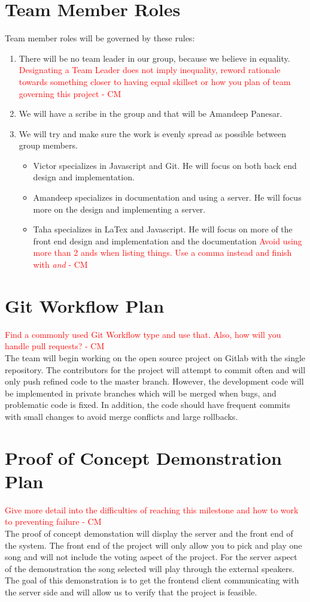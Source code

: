 \documentclass{article}
\begin{document}
\section{Team Member Roles}
Team member roles will be governed by these rules:
\begin{enumerate}
\item There will be no team leader in our group, because we believe in equality. \textcolor{red}{ Designating a Team Leader does not imply inequality, reword rationale towards something closer to having equal skillset or how you plan of team governing this project - CM} 
\item We will have a scribe in the group and that will be Amandeep Panesar.
\item We will try and make sure the work is evenly spread as possible between group members.
\begin{itemize}
\item Victor specializes in Javascript and Git. He will focus on both back end design and implementation.
\item Amandeep specializes in documentation and using a server. He will focus more on the design and implementing a server.
\item Taha specializes in LaTex and Javascript. He will focus on more of the front end design and implementation and the documentation \textcolor{red}{Avoid using more than 2 ands when listing things. Use a comma instead and finish with \textit{and} - CM} 
\end{itemize}
\end{enumerate}
\section{Git Workflow Plan}
\textcolor{red}{Find a commonly used Git Workflow type and use that. Also, how will you handle pull requests?  - CM} \\
The team will begin working on the open source project on Gitlab with the single repository. The contributors for the project will attempt to commit often and will only push refined code to the master branch. However, the development code will be implemented in private branches which will be merged when bugs, and problematic code is fixed. In addition, the code should have frequent commits with small changes to avoid merge conflicts and large rollbacks.
\section{Proof of Concept Demonstration Plan}
\textcolor{red}{Give more detail into the difficulties of reaching this milestone and how to work to preventing failure  - CM} \\
The proof of concept demonstation will display the server and the front end of the system. The front end of the project will only allow you to pick and play one song and will not include the voting aspect of the project. For the server aspect of the demonstration the song selected will play through the external speakers. The goal of this demonstration is to get the frontend client communicating with the server side and will allow us to verify that the project is feasible.
\end{document}
